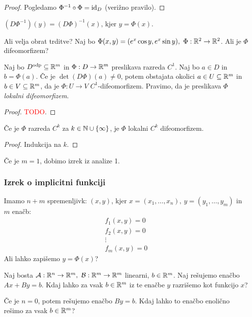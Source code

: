 \begin{proof}
    Pogledamo $\Phi^{-1} \circ \Phi = \operatorname{id}_D$ (verižno pravilo).
\end{proof}

\begin{posledica}
    $(D\Phi^{-1})(y) = (D\Phi)^{-1}(x)$, kjer $y = \Phi(x)$.
\end{posledica}

\begin{zgled}
    Ali velja obrat trditve? 
    Naj bo $\Phi(x,y) = (e^x \cos y, e^x \sin y), \ \Phi: \mathbb{R}^2 \to \mathbb{R}^2$. Ali je $\Phi$ difeomorfizem?
\end{zgled}

\begin{izrek}
    Naj bo $D^\text{odp} \subseteq \mathbb{R}^m$ in $\Phi: D \to \mathbb{R}^m$ preslikava razreda $C^1$. Naj bo $a \in D$ in $b = \Phi(a)$.
    Če je $\det(D\Phi)(a) \neq 0$, potem obstajata okolici $a \in U \subseteq \mathbb{R}^m$ in $b \in V \subseteq \mathbb{R}^m$, da je $\Phi: U \to V$ $C^1$-difeomorfizem.
    Pravimo, da je preslikava $\Phi$ \emph{lokalni difeomorfizem}.
\end{izrek}

\begin{proof}
    \textcolor{red}{TODO}.
\end{proof}

\begin{posledica}
    Če je $\Phi$ razreda $C^k$ za $k \in \mathbb{N} \cup \left\{\infty\right\}$, je $\Phi$ lokalni $C^k$ difeomorfizem.
\end{posledica}

\begin{proof}
    Indukcija na $k$.
\end{proof}

\begin{opomba}
    Če je $m=1$, dobimo izrek iz analize 1.
\end{opomba}







\newpage
\subsubsection{Izrek o implicitni funkciji}
Imamo $n+m$ spremenljivk: $(x, y)$, kjer $x = (x_1, \ldots, x_n), \ y = (y_1, \ldots, y_m)$ in $m$ enačb: 
\begin{align*}
    f_1(x,y) = 0 \\
    f_2(x,y) = 0 \\
    \vdots \\
    f_m(x,y) = 0
\end{align*}
Ali lahko zapišemo $y = \Phi(x)$?

\begin{primer}
    Naj bosta $\lin{A}: \RR^n \to \RR^m, \ \lin{B}: \RR^m \to \RR^m$ linearni, $b \in \mathbb{R}^m$. Naj rešujemo enačbo $Ax + By = b$. Kdaj lahko za vsak $b \in \mathbb{R}^m$ iz te  enačbe $y$ razrišemo kot funkcijo $x$? 

    Če je $n=0$, potem rešujemo enačbo $By = b$. Kdaj lahko to enačbo enolično rešimo za vsak $b \in \mathbb{R}^m$?
\end{primer}
